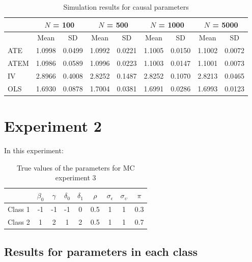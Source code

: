 \documentclass[12pt]{article}\usepackage[]{graphicx}\usepackage[]{xcolor}
\begin{document}
\begin{longtable}{lcccccccc}
\caption{Simulation results for causal parameters} \\ 
  \toprule & \multicolumn{2}{c}{$N$ = 100} & \multicolumn{2}{c}{$N$ = 500} & \multicolumn{2}{c}{$N$ = 1000} &  \multicolumn{2}{c}{$N$ = 5000} \\
 \toprule
 & Mean & SD & Mean & SD & Mean & SD & Mean & SD \\ 
  \midrule
ATE & 1.0998 & 0.0499 & 1.0992 & 0.0221 & 1.1005 & 0.0150 & 1.1002 & 0.0072 \\ 
  ATEM & 1.0986 & 0.0589 & 1.0996 & 0.0223 & 1.1003 & 0.0147 & 1.1001 & 0.0073 \\ 
  IV & 2.8966 & 0.4008 & 2.8252 & 0.1487 & 2.8252 & 0.1070 & 2.8213 & 0.0465 \\ 
  OLS & 1.6930 & 0.0878 & 1.7004 & 0.0381 & 1.6991 & 0.0286 & 1.6993 & 0.0123 \\ 
   \bottomrule
\end{longtable}



\section{Experiment 2}

In this experiment:

\begin{table}[H]
\caption{True values of the parameters for MC experiment 3}\label{tab:exp1}
\centering
\begin{tabular}{lcccccccc}
\midrule
  & $\beta_0$  & $\gamma$ & $\delta_0$  & $\delta_1$ & $\rho$ & $\sigma_{\epsilon}$ & $\sigma_{\upsilon}$ & $\pi$ \\
\midrule
Class 1 & -1 & -1  & -1  &  0 & 0.5 & 1 & 1 & 0.3\\
Class 2 &  1 &  2  &  1  &  2  & 0.5 & 1 & 1 & 0.7\\
\midrule
\end{tabular}
\end{table}

\subsection{Results for parameters in each class}
\end{document}

